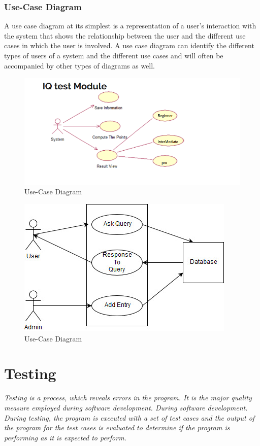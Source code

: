 \subsection{Use-Case Diagram}

A use case diagram at its simplest is a representation of a user's interaction with the system that shows the relationship between the user and the different use cases in which the user is involved. A use case diagram can identify the different types of users of a system and the different use cases and will often be accompanied by other types of diagrams as well.

\begin{figure}[h]
	\label{ss}    %
	\centering
	\includegraphics[width= 13 cm]{iqusecase.png}
	\caption{Use-Case Diagram}
\end{figure}
\newpage
\begin{figure}[h]
	\label{ss}    %
	\centering
	\includegraphics[width= 13 cm]{chatbot.jpg}
	\caption{Use-Case Diagram}
\end{figure}
\chapter{Testing}
{\em Testing is a process, which reveals errors in the program. It is the major quality measure employed during software development. During software development. During testing, the program is executed with a set of test cases and the output of the program for the test cases is evaluated to determine if the program is performing as it is expected to perform.}
